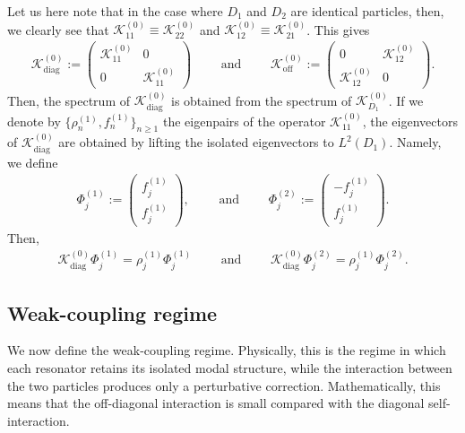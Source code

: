 \documentclass[10pt]{article}
\numberwithin{equation}{section}
\begin{document}
Let us here note that in the case where $D_1$ and $D_2$ are identical particles, then, we clearly see that $\mathcal{K}^{(0)}_{11} \equiv \mathcal{K}^{(0)}_{22}$ and $\mathcal{K}^{(0)}_{12} \equiv \mathcal{K}^{(0)}_{21}$. This gives
\begin{align*}
    \mathcal K_{\mathrm{diag}}^{(0)} :=
    \begin{pmatrix}
        \mathcal K_{11}^{(0)} & 0\\
        0 & \mathcal K_{11}^{(0)}
    \end{pmatrix}
    \qquad \text{ and } \qquad
    \mathcal K_{\mathrm{off}}^{(0)} :=
    \begin{pmatrix}
        0 & \mathcal K_{12}^{(0)}\\
        \mathcal K_{12}^{(0)} & 0
    \end{pmatrix}.
\end{align*}
Then, the spectrum of $\mathcal K_{\mathrm{diag}}^{(0)}$ is obtained from the spectrum of $\mathcal K_{D_1}^{(0)}$.
If we denote by $\{\rho_n^{(1)},f_n^{(1)}\}_{n\geq1}$ the eigenpairs of the operator $\mathcal{K}^{(0)}_{11}$, the eigenvectors of $\mathcal{K}^{(0)}_{\mathrm{diag}}$ are obtained by lifting the isolated eigenvectors to $L^2(D_1)$. Namely, we define
\begin{align}
    \Phi_j^{(1)} :=
    \begin{pmatrix}
        f_j^{(1)}\\
        f_j^{(1)}
    \end{pmatrix},
    \qquad \text{ and } \qquad
    \Phi_j^{(2)} :=
    \begin{pmatrix}
        -f_j^{(1)}\\
        f_j^{(1)}
    \end{pmatrix}.
\end{align}
Then,
\begin{align}
    \mathcal K_{\mathrm{diag}}^{(0)}\Phi_j^{(1)} = \rho_j^{(1)}\Phi_j^{(1)}
    \qquad \text{ and } \qquad
    \mathcal K_{\mathrm{diag}}^{(0)}\Phi_j^{(2)} = \rho_j^{(1)}\Phi_j^{(2)}.
\end{align}



\subsection{Weak-coupling regime}

We now define the weak-coupling regime. Physically, this is the regime in which each resonator retains its isolated modal structure, while the interaction between the two particles produces only a perturbative correction. Mathematically, this means that the off-diagonal interaction is small compared with the diagonal self-interaction.
\end{document}
